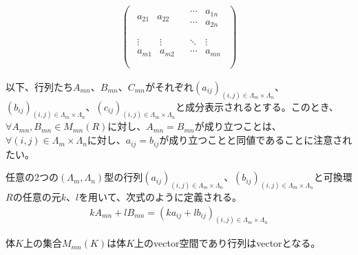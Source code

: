 \documentclass[dvipdfmx]{jsarticle}
\begin{document}
\begin{dfn}
\begin{align*}
\begin{pmatrix}
\begin{matrix}
a_{21} & a_{22} \\
\end{matrix} & \begin{matrix}
\cdots & a_{1n} \\
\cdots & a_{2n} \\
\end{matrix} \\
\begin{matrix}
 \vdots & \vdots \\
a_{m1} & a_{m2} \\
\end{matrix} & \begin{matrix}
 \ddots & \vdots \\
\cdots & a_{mn} \\
\end{matrix} \\
\end{pmatrix}
\end{align*}
\end{dfn}\par
以下、行列たち$A_{mn}$、$B_{mn}$、$C_{mn}$がそれぞれ$\left( a_{ij} \right)_{(i,j) \in \varLambda_{m} \times \varLambda_{n}}$、$\left( b_{ij} \right)_{(i,j) \in \varLambda_{m} \times \varLambda_{n}}$、$\left( c_{ij} \right)_{(i,j) \in \varLambda_{m} \times \varLambda_{n}}$と成分表示されるとする。このとき、$\forall A_{mn},B_{mn} \in M_{mn}(R)$に対し、$A_{mn} = B_{mn}$が成り立つことは、$\forall(i,j) \in \varLambda_{m} \times \varLambda_{n}$に対し、$a_{ij} = b_{ij}$が成り立つことと同値であることに注意されたい。
\begin{dfn}
任意の2つの$\left( \varLambda_{m},\varLambda_{n} \right)$型の行列$\left( a_{ij} \right)_{(i,j) \in \varLambda_{m} \times \varLambda_{n}}$、$\left( b_{ij} \right)_{(i,j) \in \varLambda_{m} \times \varLambda_{n}}$と可換環$R$の任意の元$k$、$l$を用いて、次式のように定義される。
\begin{align*}
kA_{mn} + lB_{mn} = \left( ka_{ij} + lb_{ij} \right)_{(i,j) \in \varLambda_{m} \times \varLambda_{n}}
\end{align*}
\end{dfn}
\begin{thm}\label{2.1.3.1}
体$K$上の集合$M_{mn}(K)$は体$K$上のvector空間であり行列はvectorとなる。
\end{thm}
\end{document}
